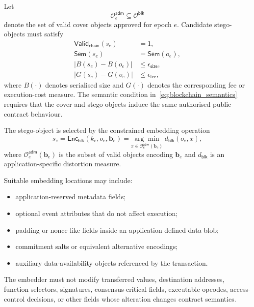 \documentclass[journal]{IEEEtran}
\theoremstyle{definition}
\theoremstyle{game}
\begin{document}
Let
\begin{equation}
\mathcal{O}^{\mathsf{adm}}_e
\subseteq
\mathcal{O}^{\mathsf{blk}}
\end{equation}
denote the set of valid cover objects approved for epoch $e$.
Candidate stego-objects must satisfy
\begin{align}
\mathsf{Valid}_{\mathsf{chain}}(s_e)
&=1,
\label{eq:blockchain_validity}
\\
\mathsf{Sem}(s_e)
&=
\mathsf{Sem}(o_e),
\label{eq:blockchain_semantics}
\\
\left|
B(s_e)-B(o_e)
\right|
&\leq
\epsilon_{\mathsf{size}},
\label{eq:blockchain_size_bound}
\\
\left|
G(s_e)-G(o_e)
\right|
&\leq
\epsilon_{\mathsf{fee}},
\label{eq:blockchain_fee_bound}
\end{align}
where $B(\cdot)$ denotes serialised size and $G(\cdot)$ denotes
the corresponding fee or execution-cost measure. The semantic
condition in~\eqref{eq:blockchain_semantics} requires that the
cover and stego objects induce the same authorised public
contract behaviour.

The stego-object is selected by the constrained embedding
operation
\begin{equation}
\label{eq:blockchain_embedding}
s_e
=
\mathsf{Enc}_{\mathsf{blk}}
\left(
k_e,o_e,\mathbf{b}_e
\right)
=
\underset{
x\in
\mathcal{O}^{\mathsf{adm}}_e(\mathbf{b}_e)
}{
\arg\min
}
\;
d_{\mathsf{blk}}(o_e,x),
\end{equation}
where
$\mathcal{O}^{\mathsf{adm}}_e(\mathbf{b}_e)$ is the subset of
valid objects encoding $\mathbf{b}_e$ and
$d_{\mathsf{blk}}$ is an application-specific distortion measure.

Suitable embedding locations may include:

\begin{itemize}
\item application-reserved metadata fields;
\item optional event attributes that do not affect execution;
\item padding or nonce-like fields inside an application-defined
      data blob;
\item commitment salts or equivalent alternative encodings;
\item auxiliary data-availability objects referenced by the
      transaction.
\end{itemize}

The embedder must not modify transferred values, destination
addresses, function selectors, signatures, consensus-critical
fields, executable opcodes, access-control decisions, or other
fields whose alteration changes contract semantics.
\end{document}
